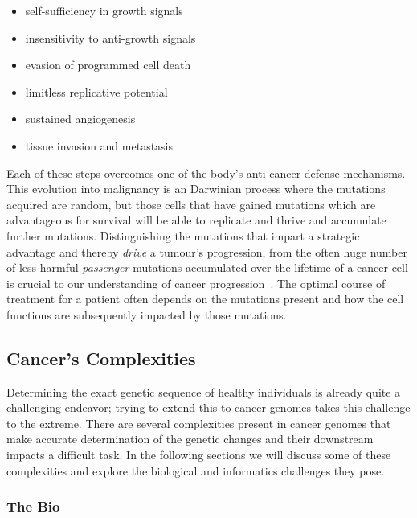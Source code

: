 \begin{justify}
\begin{itemize}
    \itemsep-0.5em
    \item self-sufficiency in growth signals
    \item insensitivity to anti-growth signals
    \item evasion of programmed cell death
    \item limitless replicative potential
    \item sustained angiogenesis
    \item tissue invasion and metastasis
\end{itemize}

Each of these steps overcomes one of the body's anti-cancer defense mechanisms. This evolution into malignancy is an Darwinian process where the mutations acquired are random, but those cells that have gained mutations which are advantageous for survival will be able to replicate and thrive and accumulate further mutations. Distinguishing the mutations that impart a strategic advantage and thereby \emph{drive} a tumour's progression, from the often huge number of less harmful \emph{passenger} mutations accumulated over the lifetime of a cancer cell is crucial to our understanding of cancer progression~\cite{stratton2009cancer}. The optimal course of treatment for a patient often depends on the mutations present and how the cell functions are subsequently impacted by those mutations. %



\subsection{Cancer's Complexities}

Determining the exact genetic sequence of healthy individuals is already quite a challenging endeavor; trying to extend this to cancer genomes takes this challenge to the extreme. There are several complexities present in cancer genomes that make accurate determination of the genetic changes and their downstream impacts a difficult task. In the following sections we will discuss some of these complexities and explore the biological and informatics challenges they pose.

\subsubsection{The Bio}

\end{justify}
